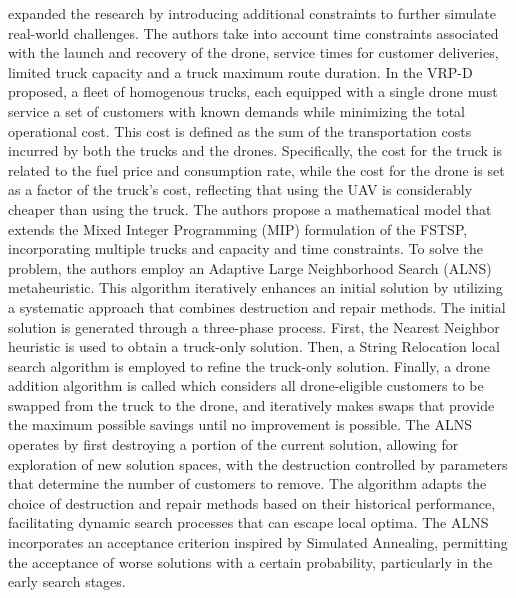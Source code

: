 \documentclass{article}
\begin{document}
	\citeauthor{Sacramento2019} \cite{Sacramento2019} expanded the research by introducing additional constraints to further simulate real-world challenges. The authors take into account time constraints associated with the launch and recovery of the drone, service times for customer deliveries, limited truck capacity and a truck maximum route duration. In the VRP-D proposed, a fleet of homogenous trucks, each equipped with a single drone must service a set of customers with known demands while minimizing the total operational cost. This cost is defined as the sum of the transportation costs incurred by both the trucks and the drones. Specifically, the cost for the truck is related to the fuel price and consumption rate, while the cost for the drone is set as a factor of the truck's cost, reflecting that using the UAV is considerably cheaper than using the truck. The authors propose a mathematical model that extends the Mixed Integer Programming (MIP) formulation of the FSTSP, incorporating multiple trucks and capacity and time constraints. To solve the problem, the authors employ an Adaptive Large Neighborhood Search (ALNS) metaheuristic. This algorithm iteratively enhances an initial solution by utilizing a systematic approach that combines destruction and repair methods. The initial solution is generated through a three-phase process. First, the Nearest Neighbor heuristic is used to obtain a truck-only solution. Then, a String Relocation local search algorithm is employed to refine the truck-only solution. Finally, a drone addition algorithm is called which considers all drone-eligible customers to be swapped from the truck to the drone, and iteratively makes swaps that provide the maximum possible savings until no improvement is possible. The ALNS operates by first destroying a portion of the current solution, allowing for exploration of new solution spaces, with the destruction controlled by parameters that determine the number of customers to remove. The algorithm adapts the choice of destruction and repair methods based on their historical performance, facilitating dynamic search processes that can escape local optima. The ALNS incorporates an acceptance criterion inspired by Simulated Annealing, permitting the acceptance of worse solutions with a certain probability, particularly in the early search stages.
	\par 
\end{document}
